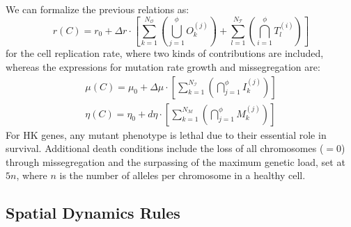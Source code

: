\documentclass[10pt, aps, rmp,  twocolumn, superscriptaddress, floatfix, showkeys]{revtex4-2}
\begin{document}
We can formalize the previous relations as:
\begin{equation}
    {r}(C) = r_0 +\Delta r\cdot \left [
\sum_{k=1}^{N_\mathcal{O}} \left ( \bigcup_{j=1}^{\phi} {O}_k^{(j)} \right )+
 \sum_{l=1}^{N_{\mathcal{T}}} \left ( \bigcap_{i=1}^{\phi} {T}_l^{(i)} \right )
\right ]
\end{equation}
for the cell replication rate, where two kinds of contributions are included, whereas the expressions for mutation rate growth and missegregation are:
\begin{eqnarray}
{\mu}(C) = \mu_0 +\Delta\mu\cdot \left [
\sum_{k=1}^{N_\mathcal{I}} \left ( \bigcap_{j=1}^{\phi} {I}_k^{(j)} \right )\right ] \\
{\eta}(C) = \eta_0 +d\eta\cdot \left [
\sum_{k=1}^{N_\mathcal{M}} \left ( \bigcap_{j=1}^{\phi} {M}_k^{(j)} \right )\right ]
\end{eqnarray}
For HK genes, any mutant phenotype is lethal due to their essential role in survival. Additional death conditions include the loss of all chromosomes ($=0$) through missegregation and the surpassing of the maximum genetic load, set at $5n$, where $n$ is the number of alleles per chromosome in a healthy cell.


\subsection*{Spatial Dynamics Rules}
\end{document}
